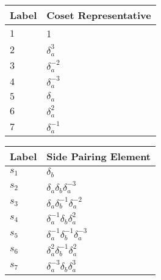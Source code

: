 \documentclass{article}
\begin{document}
\begin{center}
\begin{tabular}{ll}
\toprule
Label & Coset Representative\\
\midrule
$1$ & 1 \\
$2$ & $\delta_a^{3}$ \\
$3$ & $\delta_a^{-2}$ \\
$4$ & $\delta_a^{-3}$ \\
$5$ & $\delta_a^{}$ \\
$6$ & $\delta_a^{2}$ \\
$7$ & $\delta_a^{-1}$ \\
\bottomrule
\end{tabular}
\hfill
\begin{tabular}{ll}
\toprule
Label & Side Pairing Element\\
\midrule
$s_{1}$ & $\delta_b^{}$ \\
$s_{2}$ & $\delta_a^{}\delta_b^{}\delta_a^{-3}$ \\
$s_{3}$ & $\delta_a^{}\delta_b^{-1}\delta_a^{-2}$ \\
$s_{4}$ & $\delta_a^{-1}\delta_b^{}\delta_a^{2}$ \\
$s_{5}$ & $\delta_a^{-1}\delta_b^{-1}\delta_a^{-3}$ \\
$s_{6}$ & $\delta_a^{2}\delta_b^{-1}\delta_a^{2}$ \\
$s_{7}$ & $\delta_a^{-3}\delta_b^{}\delta_a^{3}$ \\
\bottomrule
\end{tabular}
\end{center}

\thispagestyle{empty}
\end{document}
